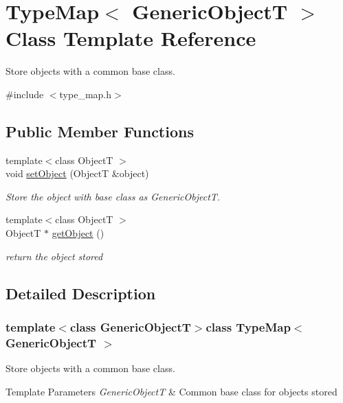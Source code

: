\hypertarget{classTypeMap}{\section{Type\-Map$<$ Generic\-Object\-T $>$ Class Template Reference}
\label{classTypeMap}
}


Store objects with a common base class.  




{\ttfamily \#include $<$type\-\_\-map.\-h$>$}

\subsection*{Public Member Functions}
\begin{DoxyCompactItemize}
\item 
{\footnotesize template$<$class Object\-T $>$ }\\void \hyperlink{classTypeMap_a738b13adaac930d128c1a81b08628b9e}{set\-Object} (Object\-T \&object)
\begin{DoxyCompactList}\small\item\em Store the object with base class as Generic\-Object\-T. \end{DoxyCompactList}\item 
{\footnotesize template$<$class Object\-T $>$ }\\Object\-T $\ast$ \hyperlink{classTypeMap_af45351278345a92d2d2fb13a977858aa}{get\-Object} ()
\begin{DoxyCompactList}\small\item\em return the object stored \end{DoxyCompactList}\end{DoxyCompactItemize}


\subsection{Detailed Description}
\subsubsection*{template$<$class Generic\-Object\-T$>$class Type\-Map$<$ Generic\-Object\-T $>$}

Store objects with a common base class. 


\begin{DoxyTemplParams}{Template Parameters}
{\em Generic\-Object\-T} & Common base class for objects stored \\
\hline
\end{DoxyTemplParams}


